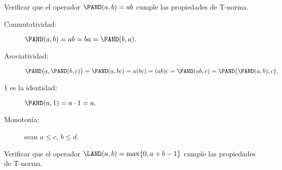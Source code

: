 Verificar que el operador \(\PAND(a, b) = ab\)
cumple las propiedades de T-norma.
%
\begin{description}
  \item[Conmutatividad:]
    \(
      \PAND(a, b) =
      ab =
      ba =
      \PAND(b, a).
    \)
  \item[Asociatividad:]
    \(
      \PAND\bigl(a, \PAND(b, c)\bigr) =
      \PAND(a, bc) =
      a(bc) =
      (ab)c =
      \PAND(ab, c) =
      \PAND\bigl(\PAND(a, b), c\bigr).
    \)
  \item[1 es la identidad:]
    \(
      \PAND(a, 1) = a\cdot 1 = a.
    \)
  \item[Monotonía:] sean \(a ≤ c\), \(b ≤ d\).

\end{description}

Verificar que el operador \(\LAND(a, b) = \max\{0, a + b - 1\}\)
cumple las propiedades de T-norma.
%
